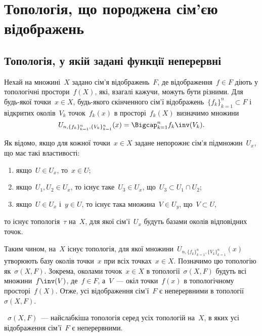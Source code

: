 \newcommand{\InducedNeighbourhood}[1]{U_{n,\{f_k\}_{k=1}^n,\{V_k\}_{k=1}^n}(#1)}

\chapter{Топологія, що породжена сім'єю відображень}

\section{Топологія, у якій задані функції неперервні}

Нехай на множині~$X$ задано сім'я відображень~$F$, де відображення~$f \in F$ діють у топологічні простори~$f(X)$, які, взагалі кажучи, можуть бути різними. Для будь-якої точки~$x \in X$, будь-якого скінченного сім'ї відображень~$\{f_k\}_{k = 1}^n \subset F$ і відкритих околів~$V_k$ точок~$f_k(x)$ в просторі~$f_k(X)$ визначимо множини
\begin{equation*}
    \InducedNeighbourhood{x} = \Bigcap_{k = 1}^n f_k\inv(V_k).
\end{equation*}

Як відомо, якщо для кожної точки~$x \in X$ задане непорожнє сім'я підмножин~$U_x$, що має такі властивості:
\begin{enumerate}
    \item якщо~$U \in U_x$, то~$x \in U$;
    \item якщо~$U_1, U_2 \in U_x$, то існує таке~$U_3 \in U_x$, що~$U_3 \subset U_1 \cap U_2$;
    \item якщо~$U \in U_x$ і~$y \in U$, то існує така множина~$V \in U_y$, що~$V \subset U$,
\end{enumerate}
то існує топологія~$\tau$ на~$X$, для якої сім'ї~$U_x$ будуть базами околів відповідних точок. 

Таким чином, на~$X$ існує топологія, для якої множини~$\InducedNeighbourhood{x}$ утворюють базу околів точки~$x$ при всіх точках~$x \in X$. Позначимо цю топологію як~$\sigma(X, F)$. Зокрема, околами точок~$x \in X$ в топології~$\sigma(X, F)$ будуть всі множини~$f\inv(V)$, де~$f \in F$, а~$V$~--- окіл точки~$f(x)$ в топологічному просторі~$f(X)$. Отже, усі відображення сім'ї~$F$ є неперервними в топології~$\sigma(X, F)$.

\begin{theorem}
   ~$\sigma(X, F)$~--- найслабкіша топологія серед усіх топологій на~$X$, в яких усі відображення сім'ї~$F$ є неперервними.
\end{theorem}

